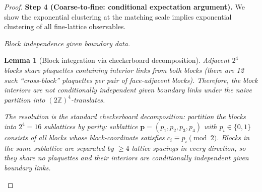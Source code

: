 \documentclass[11pt]{article}
\newtheorem{lemma}[theorem]{Lemma}
\theoremstyle{definition}
\newcommand{\Z}{\mathbb{Z}}
\begin{document}
\begin{proof}
\medskip\noindent\textbf{Step 4 (Coarse-to-fine: conditional
expectation argument).}
We show the exponential clustering at the matching scale implies
exponential clustering of all fine-lattice observables.

\emph{Block independence given boundary data.}

\begin{lemma}[Block integration via checkerboard decomposition]%
\label{lem:plaquette-block}
Adjacent $2^4$ blocks share plaquettes containing interior links
from both blocks (there are 12 such ``cross-block'' plaquettes
per pair of face-adjacent blocks).  Therefore, the block interiors
are not conditionally independent given boundary links
under the naive partition into $(2\Z)^4$-translates.

The resolution is the standard \emph{checkerboard decomposition}:
partition the blocks into $2^4=16$ sublattices by parity:
sublattice $\mathbf{p}=(p_1,p_2,p_3,p_4)$ with $p_i\in\{0,1\}$
consists of all blocks whose block-coordinate satisfies
$c_i\equiv p_i\pmod{2}$.  Blocks in the same sublattice
are separated by $\ge 4$ lattice spacings in every direction,
so they share no plaquettes and their interiors are
conditionally independent given boundary links.


\end{lemma}
\end{proof}
\end{document}
